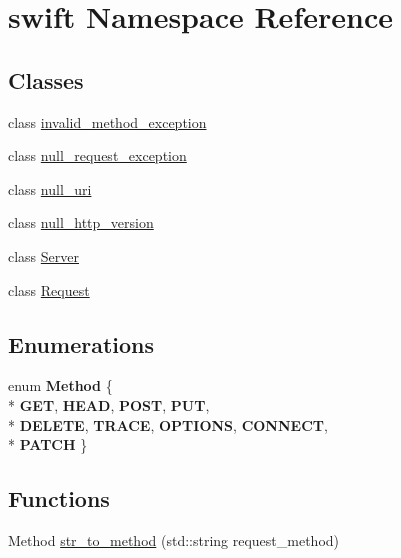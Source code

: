 \hypertarget{namespaceswift}{\section{swift Namespace Reference}
\label{namespaceswift}
}
\subsection*{Classes}
\begin{DoxyCompactItemize}
\item 
class \hyperlink{classswift_1_1invalid__method__exception}{invalid\-\_\-method\-\_\-exception}
\item 
class \hyperlink{classswift_1_1null__request__exception}{null\-\_\-request\-\_\-exception}
\item 
class \hyperlink{classswift_1_1null__uri}{null\-\_\-uri}
\item 
class \hyperlink{classswift_1_1null__http__version}{null\-\_\-http\-\_\-version}
\item 
class \hyperlink{classswift_1_1_server}{Server}
\item 
class \hyperlink{classswift_1_1_request}{Request}
\end{DoxyCompactItemize}
\subsection*{Enumerations}
\begin{DoxyCompactItemize}
\item 
enum {\bfseries Method} \{ \\*
{\bfseries G\-E\-T}, 
{\bfseries H\-E\-A\-D}, 
{\bfseries P\-O\-S\-T}, 
{\bfseries P\-U\-T}, 
\\*
{\bfseries D\-E\-L\-E\-T\-E}, 
{\bfseries T\-R\-A\-C\-E}, 
{\bfseries O\-P\-T\-I\-O\-N\-S}, 
{\bfseries C\-O\-N\-N\-E\-C\-T}, 
\\*
{\bfseries P\-A\-T\-C\-H}
 \}
\end{DoxyCompactItemize}
\subsection*{Functions}
\begin{DoxyCompactItemize}
\item 
Method \hyperlink{namespaceswift_a54d9cafe8eb822e4a2fedef9d724a702}{str\-\_\-to\-\_\-method} (std\-::string request\-\_\-method)
\end{DoxyCompactItemize}
